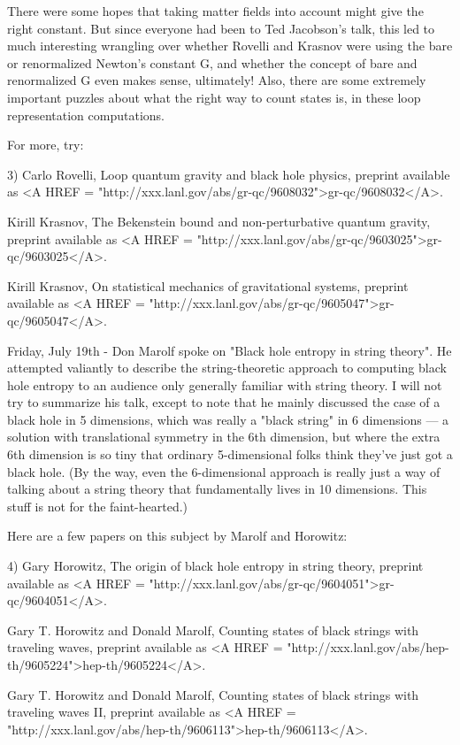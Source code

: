 There were some hopes that taking matter fields into account might
give the right constant.  But since everyone had been to Ted
Jacobson's talk, this led to much interesting wrangling over whether
Rovelli and Krasnov were using the bare or renormalized Newton's
constant G, and whether the concept of bare and renormalized G even
makes sense, ultimately!  Also, there are some extremely important
puzzles about what the right way to count states is, in these loop
representation computations.

For more, try:

3) Carlo Rovelli, Loop quantum gravity and black hole physics, preprint
available as <A HREF = "http://xxx.lanl.gov/abs/gr-qc/9608032">gr-qc/9608032</A>.  

Kirill Krasnov, The Bekenstein bound and non-perturbative quantum gravity,
preprint available as <A HREF = "http://xxx.lanl.gov/abs/gr-qc/9603025">gr-qc/9603025</A>.

Kirill Krasnov, On statistical mechanics of gravitational systems, 
preprint available as <A HREF = "http://xxx.lanl.gov/abs/gr-qc/9605047">gr-qc/9605047</A>.

Friday, July 19th - Don Marolf spoke on "Black hole entropy in string
theory".  He attempted valiantly to describe the string-theoretic
approach to computing black hole entropy to an audience only generally
familiar with string theory.  I will not try to summarize his talk,
except to note that he mainly discussed the case of a black hole in 5
dimensions, which was really a "black string" in 6 dimensions --- a
solution with translational symmetry in the 6th dimension, but where
the extra 6th dimension is so tiny that ordinary 5-dimensional folks
think they've just got a black hole.  (By the way, even the
6-dimensional approach is really just a way of talking about a string
theory that fundamentally lives in 10 dimensions.  This stuff is not
for the faint-hearted.)

Here are a few papers on this subject by Marolf and Horowitz:

4) Gary Horowitz, The origin of black hole entropy in string theory, 
preprint available as <A HREF = "http://xxx.lanl.gov/abs/gr-qc/9604051">gr-qc/9604051</A>.

Gary T. Horowitz and Donald Marolf, Counting states of black strings with 
traveling waves, preprint available as <A HREF = "http://xxx.lanl.gov/abs/hep-th/9605224">hep-th/9605224</A>.

Gary T. Horowitz and Donald Marolf, Counting states of black strings with 
traveling waves II, preprint available as <A HREF = "http://xxx.lanl.gov/abs/hep-th/9606113">hep-th/9606113</A>.

